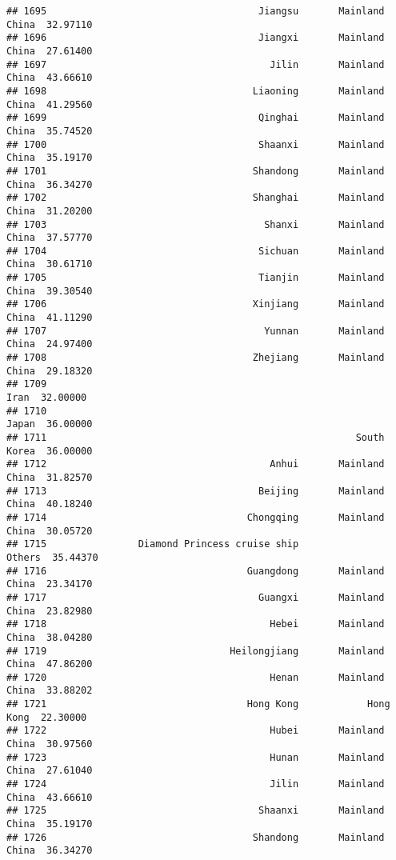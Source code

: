 \documentclass[
]{article}
\begin{document}
\begin{verbatim}
## 1695                                     Jiangsu       Mainland China  32.97110
## 1696                                     Jiangxi       Mainland China  27.61400
## 1697                                       Jilin       Mainland China  43.66610
## 1698                                    Liaoning       Mainland China  41.29560
## 1699                                     Qinghai       Mainland China  35.74520
## 1700                                     Shaanxi       Mainland China  35.19170
## 1701                                    Shandong       Mainland China  36.34270
## 1702                                    Shanghai       Mainland China  31.20200
## 1703                                      Shanxi       Mainland China  37.57770
## 1704                                     Sichuan       Mainland China  30.61710
## 1705                                     Tianjin       Mainland China  39.30540
## 1706                                    Xinjiang       Mainland China  41.11290
## 1707                                      Yunnan       Mainland China  24.97400
## 1708                                    Zhejiang       Mainland China  29.18320
## 1709                                                             Iran  32.00000
## 1710                                                            Japan  36.00000
## 1711                                                      South Korea  36.00000
## 1712                                       Anhui       Mainland China  31.82570
## 1713                                     Beijing       Mainland China  40.18240
## 1714                                   Chongqing       Mainland China  30.05720
## 1715                Diamond Princess cruise ship               Others  35.44370
## 1716                                   Guangdong       Mainland China  23.34170
## 1717                                     Guangxi       Mainland China  23.82980
## 1718                                       Hebei       Mainland China  38.04280
## 1719                                Heilongjiang       Mainland China  47.86200
## 1720                                       Henan       Mainland China  33.88202
## 1721                                   Hong Kong            Hong Kong  22.30000
## 1722                                       Hubei       Mainland China  30.97560
## 1723                                       Hunan       Mainland China  27.61040
## 1724                                       Jilin       Mainland China  43.66610
## 1725                                     Shaanxi       Mainland China  35.19170
## 1726                                    Shandong       Mainland China  36.34270

\end{verbatim}
\end{document}
